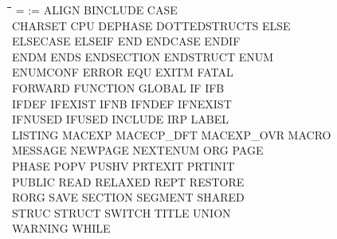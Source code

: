 {\tt\begin{tabbing}
\hspace{3cm}\=\hspace{3cm}\=\hspace{3cm}\=\hspace{3cm}\=\kill
=          \> :=          \> ALIGN       \> BINCLUDE    \> CASE \\
CHARSET    \> CPU         \> DEPHASE     \> DOTTEDSTRUCTS\> ELSE \\
ELSECASE   \> ELSEIF      \> END         \> ENDCASE     \> ENDIF \\
ENDM       \> ENDS        \> ENDSECTION  \> ENDSTRUCT   \> ENUM \\
ENUMCONF   \> ERROR       \> EQU         \> EXITM       \> FATAL \\
FORWARD    \> FUNCTION    \> GLOBAL      \> IF          \> IFB \\
IFDEF      \> IFEXIST     \> IFNB        \> IFNDEF      \> IFNEXIST \\
IFNUSED    \> IFUSED      \> INCLUDE     \> IRP         \> LABEL \\
LISTING    \> MACEXP      \> MACECP\_DFT \> MACEXP\_OVR \> MACRO \\
MESSAGE    \> NEWPAGE     \> NEXTENUM    \> ORG         \> PAGE \\
PHASE      \> POPV        \> PUSHV       \> PRTEXIT     \> PRTINIT \\
PUBLIC     \> READ        \> RELAXED     \> REPT        \> RESTORE \\
RORG       \> SAVE        \> SECTION     \> SEGMENT     \> SHARED \\
STRUC      \> STRUCT      \> SWITCH      \> TITLE       \> UNION \\
WARNING    \> WHILE \\
\end{tabbing}}
